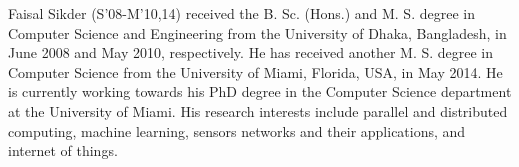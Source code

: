 \documentclass[]{IEEEtran}
\begin{document}
\begin{IEEEbiography}
{Faisal Sikder} 
 (S'08-M'10,14) received the B. Sc. (Hons.) and M. S. degree in Computer Science and Engineering from the
University of Dhaka, Bangladesh, in June 2008 and May 2010, respectively. He has received another M. S. degree
in Computer Science from the University of Miami, Florida, USA, in May 2014. He is currently working towards his PhD 
degree in the Computer Science department at the University of Miami. His research interests include parallel and 
distributed computing, machine learning, sensors networks and their applications, and internet of things.
\end{IEEEbiography}
\vfill
\end{document}
